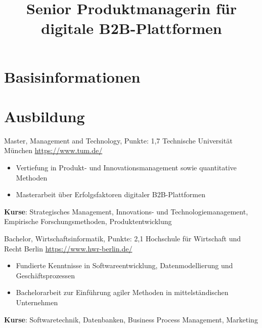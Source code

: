 \documentclass[a4paper, serif, 10pt]{moderncv}
\title{Senior Produktmanagerin für digitale B2B-Plattformen}
\begin{document}
\maketitle

\section{Basisinformationen}

\section{Ausbildung}

        {Master, Management and Technology, Punkte: 1,7}
        {Technische Universität München}
        {\url{https://www.tum.de/}}
        {}
        {\begin{itemize}
\item Vertiefung in Produkt- und Innovationsmanagement sowie quantitative Methoden
\item Masterarbeit über Erfolgsfaktoren digitaler B2B-Plattformen
\end{itemize}
\textbf{Kurse}: Strategisches Management, Innovations- und Technologiemanagement, Empirische Forschungsmethoden, Produktentwicklung}

        {Bachelor, Wirtschaftsinformatik, Punkte: 2,1}
        {Hochschule für Wirtschaft und Recht Berlin}
        {\url{https://www.hwr-berlin.de/}}
        {}
        {\begin{itemize}
\item Fundierte Kenntnisse in Softwareentwicklung, Datenmodellierung und Geschäftsprozessen
\item Bachelorarbeit zur Einführung agiler Methoden in mittelständischen Unternehmen
\end{itemize}
\textbf{Kurse}: Softwaretechnik, Datenbanken, Business Process Management, Marketing}
\end{document}
